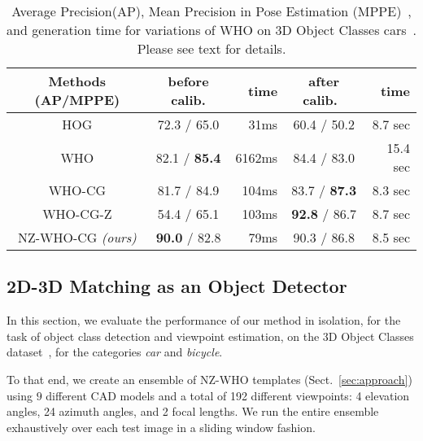 \begin{table}[!htbp]
  \footnotesize
  \setlength{\tabcolsep}{1pt}
  \centering
  \begin{tabular}{|c|c|r|c|r|}
    \hline
    Methods (AP/MPPE) & before calib.  & time & after calib.~\cite{Aubry14} & time \\
    \hline\hline
    HOG\cite{Dalal05}      & 72.3 / 65.0          &  31ms  & 60.4 / 50.2           & 8.7 sec \\ 
    WHO\cite{Hariharan12}  & 82.1 / \textbf{85.4} &  6162ms& 84.4 / 83.0           & 15.4 sec\\
    WHO-CG                 & 81.7 / 84.9          &  104ms & 83.7 / \textbf{87.3}  & 8.3 sec \\
    WHO-CG-Z               & 54.4 / 65.1          &  103ms & \textbf{92.8} / 86.7  & 8.7 sec \\
    NZ-WHO-CG {\em (ours)} & \textbf{90.0} / 82.8 &   79ms & 90.3 / 86.8           & 8.5 sec \\
    \hline
  \end{tabular}
  \caption{Average Precision(AP), Mean Precision in Pose Estimation
    (MPPE)~\cite{Lopez-Sastre11}, and generation time for variations of WHO on
    3D Object Classes cars~\cite{Savarese07}. Please see text for
    details.}
  \label{tab:who_initializations}
\end{table}


\subsection{2D-3D Matching as an Object Detector} 
\label{sec:exp_iso}
In this section, we evaluate the performance of our method in
isolation, for the task of object class detection and viewpoint
estimation, on the 3D Object Classes dataset~\cite{Savarese07}, for the
categories {\em car} and {\em bicycle}.

To that end, we create an ensemble of NZ-WHO templates (Sect.~\ref{sec:approach})
using $9$ different CAD models and a total of 192 different
viewpoints: 4 elevation angles, 24 azimuth angles,
and 2 focal lengths. We run the entire ensemble exhaustively over
each test image in a sliding window fashion.

